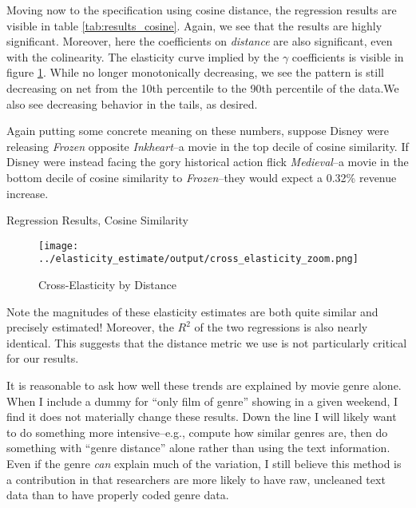 \documentclass{article}
\begin{document}
Moving now to the specification using cosine distance, the regression results are visible in table \ref{tab:results_cosine}. Again, we see that the results are highly significant. Moreover, here the coefficients on \emph{distance} are also significant, even with the colinearity. The elasticity curve implied by the $\gamma$ coefficients is visible in figure \ref{fig:cross_elasticity}. While no longer monotonically decreasing, we see the pattern is still decreasing on net from the 10th percentile to the 90th percentile of the data.We also see decreasing behavior in the tails, as desired. 

Again putting some concrete meaning on these numbers, suppose Disney were releasing \emph{Frozen} opposite \emph{Inkheart}--a movie in the top decile of cosine similarity. If Disney were instead facing the gory historical action flick \emph{Medieval}--a movie in the bottom decile of cosine similarity to \emph{Frozen}--they would expect a 0.32\% revenue increase. 

\begin{table}
    \begin{center}
    

    \caption{Regression Results, Cosine Similarity}
    \label{tab:results_cosine}
    \end{center}
\end{table}

\begin{figure}
    \begin{center}
    \texttt{[image: ../elasticity\_estimate/output/cross\_elasticity\_zoom.png]}

    \caption{Cross-Elasticity by Distance}
    \label{fig:cross_elasticity}
    \end{center}
\end{figure}

Note the magnitudes of these elasticity estimates are both quite similar and precisely estimated! Moreover, the $R^2$ of the two regressions is also nearly identical. This suggests that the distance metric we use is not particularly critical for our results.

It is reasonable to ask how well these trends are explained by movie genre alone. When I include a dummy for ``only film of genre'' showing in a given weekend, I find it does not materially change these results. Down the line I will likely want to do something more intensive--e.g., compute how similar genres are, then do something with ``genre distance'' alone rather than using the text information. Even if the genre \emph{can} explain much of the variation, I still believe this method is a contribution in that researchers are more likely to have raw, uncleaned text data than to have properly coded genre data. 
\end{document}
